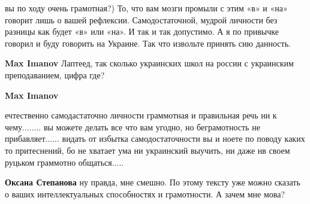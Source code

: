 \begin{itemize}
\begin{itemize}
вы по ходу очень грамотная?) То, что вам мозги промыли с этим «в» и «на»
говорит лишь о вашей рефлексии. Самодостаточной, мудрой личности без разницы
как будет «в» или «на». И так и так допустимо. А я по привычке говорил и буду
говорить на Украине. Так что извольте принять сию данность.


 
\textbf{Max Imanov} Лаптеед, так сколько украинских школ на россии с украинским преподаванием, цифра где?

 
\textbf{Max Imanov} 

ечтественно самодастаточно личности граммотная и правильная
речь ни к чему........ вы можете делать все что вам угодно, но беграмотность не
прибавляет...... видать от избытка самодостаточности вы и ноете по поводу каких
то притеснений, бо не хватает ума ни украинский выучить, ни даже нв своем
руцьком граммотно общаться.....

 
\textbf{Оксана Степанова} ну правда, мне смешно. По этому тексту уже можно сказать о ваших интеллектуальных способностях и грамотности. А зачем мне мова?

\end{itemize}

\end{itemize}

